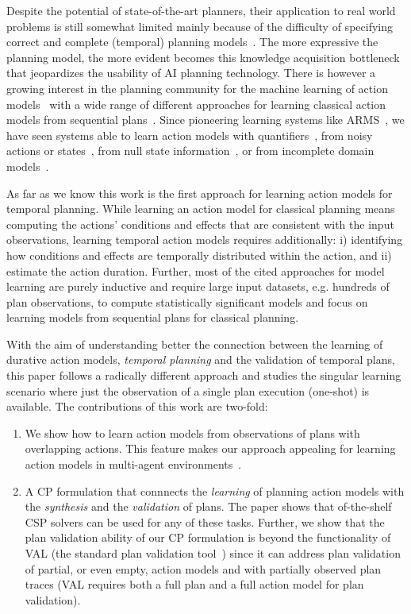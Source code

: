 \documentclass{ecai}
\begin{document}
Despite the potential of state-of-the-art planners, their application to real world problems is still somewhat limited mainly because of the difficulty of specifying correct and complete (temporal) planning models~\cite{kambhampati2007model}. The more expressive the planning model, the more evident becomes this knowledge acquisition bottleneck that jeopardizes the usability of AI planning technology. There is however a growing interest in the planning community for the machine learning of action models~\cite{kuvcera2018louga,MouraoZPS12,yang2007learning,zhuo2013action} with a wide range of different approaches for learning classical action models from sequential plans~\cite{arora2018review}. Since pioneering learning systems like ARMS~\cite{yang2007learning}, we have seen systems able to learn action models with quantifiers~\cite{AmirC08,ZhuoYHL10}, from noisy actions or states~\cite{MouraoZPS12,zhuo2013action}, from null state information~\cite{cresswell2013}, or from incomplete domain models~\cite{ZhuoK17,ZhuoNK13}.

As far as we know this work is the first approach for learning action models for temporal planning. While learning an action model for classical planning means computing the actions' conditions and effects that are consistent with the input observations, learning temporal action models requires additionally: i) identifying how conditions and effects are temporally distributed within the action, and ii) estimate the action duration. Further, most of the cited approaches for model learning are purely inductive and require large input datasets, e.g. hundreds of plan observations, to compute statistically significant models and focus on learning models from sequential plans for classical planning.

With the aim of understanding better the connection between the learning of durative action models, {\em temporal planning}  and the validation of temporal plans, this paper follows a radically different approach and studies the singular learning scenario where just the observation of a single plan execution (one-shot) is available. The contributions of this work are two-fold:

\begin{enumerate}  
\item We show how to learn action models from observations of plans with overlapping actions. This feature makes our approach appealing for learning action models in multi-agent environments~\cite{furelos2018carpool}. 
\item A CP formulation that connnects the {\em learning} of planning action models with the {\em synthesis} and the {\em validation} of plans. The paper shows that of-the-shelf CSP solvers can be used for any of these tasks. Further, we show that the plan validation ability of our CP formulation is beyond the functionality of VAL (the standard plan validation tool~\cite{howey2004val}) since it can address plan validation of partial, or even empty, action models and with partially observed plan traces (VAL requires both a full plan and a full action model for plan validation). 
\end{enumerate}
\end{document}
